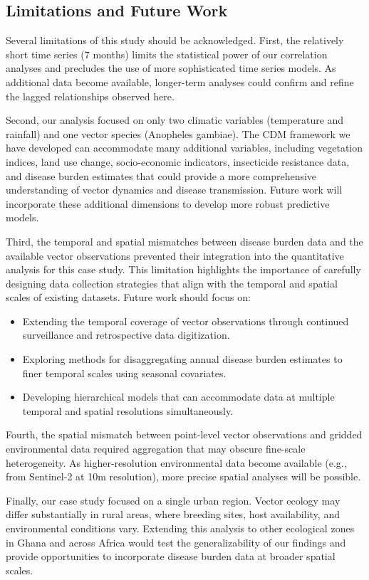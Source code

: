 \documentclass{article}
\begin{document}
\subsection{Limitations and Future Work}
\par
Several limitations of this study should be acknowledged. First, the relatively short time series (7 months) limits the statistical 
power of our correlation analyses and precludes the use of more sophisticated time series models. As additional data become available, 
longer-term analyses could confirm and refine the lagged relationships observed here.
\par
Second, our analysis focused on only two climatic variables (temperature and rainfall) and one vector species (Anopheles gambiae). 
The CDM framework we have developed can accommodate many additional variables, including vegetation indices, land use change, 
socio-economic indicators, insecticide resistance data, and disease burden estimates that could provide a more comprehensive 
understanding of vector dynamics and disease transmission. Future work will incorporate these additional dimensions to develop 
more robust predictive models.
\par
Third, the temporal and spatial mismatches between disease burden data and the available vector observations prevented their 
integration into the quantitative analysis for this case study. This limitation highlights the importance of carefully designing 
data collection strategies that align with the temporal and spatial scales of existing datasets. Future work should focus on:

\begin{itemize}
    \item Extending the temporal coverage of vector observations through continued surveillance and retrospective data digitization.
    \item Exploring methods for disaggregating annual disease burden estimates to finer temporal scales using seasonal covariates.
    \item Developing hierarchical models that can accommodate data at multiple temporal and spatial resolutions simultaneously.
\end{itemize}
\par
Fourth, the spatial mismatch between point-level vector observations and gridded environmental data required aggregation that 
may obscure fine-scale heterogeneity. As higher-resolution environmental data become available (e.g., from Sentinel-2 at 10m 
resolution), more precise spatial analyses will be possible.
\par
Finally, our case study focused on a single urban region. Vector ecology may differ substantially in rural areas, where breeding 
sites, host availability, and environmental conditions vary. Extending this analysis to other ecological zones in Ghana and 
across Africa would test the generalizability of our findings and provide opportunities to incorporate disease burden 
data at broader spatial scales.
\end{document}
